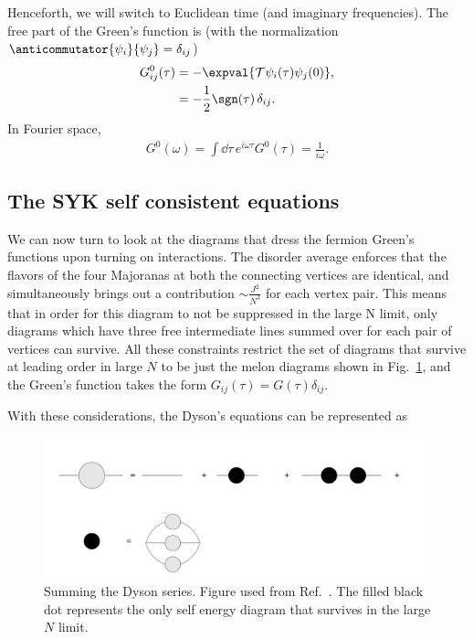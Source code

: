 \par
Henceforth, we will switch to Euclidean time (and imaginary frequencies). The free part of the Green's function is (with the normalization $\anticommutator{\psi_i}{\psi_j} = \delta_{ij}$)
\begin{align}
    G^0_{ij}(\tau) &= -\expval{\mathcal{T}\psi_i(\tau)\psi_j(0)} ,\nonumber\\
    &= -\frac{1}{2}\sgn(\tau) \, \delta_{ij}.
\end{align}
In Fourier space,  
\begin{align}
    G^0(\omega) = \int \dd\tau \,e^{i\omega\tau} G^0(\tau) = \frac{1}{i\omega}.
\end{align}

\subsection{The SYK self consistent equations}
We can now turn to look at the diagrams that dress the fermion Green's functions upon turning on interactions.  The disorder average enforces that the flavors of the four Majoranas at both the connecting vertices are identical, and simultaneously brings out a contribution $\sim \frac{J^2}{N^3}$ for each vertex pair. This means that in order for this diagram to not be suppressed in the large N limit, only diagrams which have three free intermediate lines summed over for each pair of vertices can survive. All these constraints 
 restrict the set of diagrams that survive at leading order in large $N$ to be just the melon diagrams shown in Fig.~\ref{fig:melons}, and the Green's function takes the form $G_{ij}(\tau) = G(\tau)\delta_{ij}$.

\par
With these considerations, the Dyson's equations can be represented as
\begin{figure}
    \centering
    \includegraphics[width= \linewidth]{figures/introduction/Melons.png}
    \caption{Summing the Dyson series. Figure used from Ref.~\cite{maldacena_comments_2016}. The filled black dot represents the only self energy diagram that survives in the large $N$ limit.}
    \label{fig:melons}
\end{figure}
  
